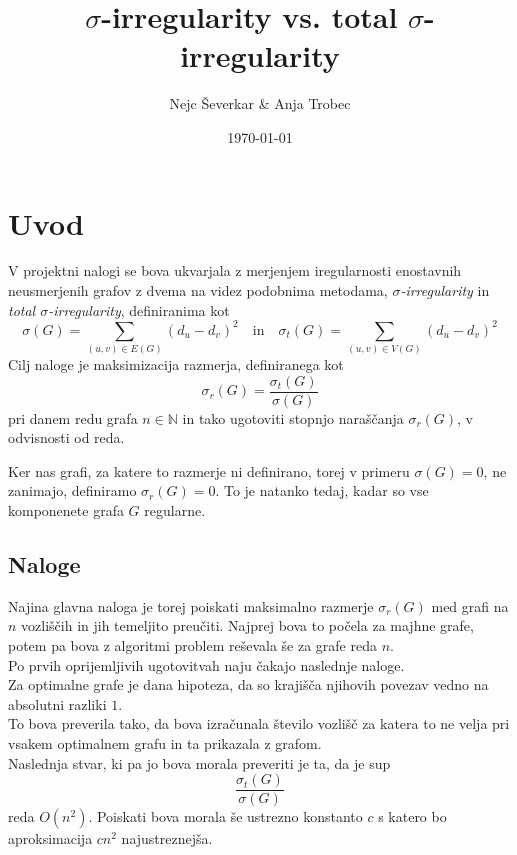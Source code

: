 \documentclass[ letterpaper, titlepage, fleqn]{article}
\begin{document}
\title{$\sigma$-irregularity vs. total $\sigma$-irregularity}
\author{Nejc Ševerkar \& Anja Trobec}
\date{\today}
\maketitle

\section{Uvod}
V projektni nalogi se bova ukvarjala z merjenjem iregularnosti enostavnih neusmerjenih grafov z
dvema na videz podobnima metodama, {\em $\sigma$-irregularity} in {\em total $\sigma$-irregularity},
definiranima kot 
$$
\sigma(G) = \sum_{(u, v) \in E(G)}(d_u - d_v)^2 
\quad \text{in} \quad
\sigma_t(G) = \sum_{(u, v) \in V(G)}(d_u - d_v)^2
$$
Cilj naloge je maksimizacija razmerja, definiranega kot 
$$\sigma_r(G) = \frac{\sigma_t(G)}{\sigma(G)}$$
pri danem redu grafa $n \in \mathbb{N}$ in tako ugotoviti 
stopnjo naraščanja $\sigma_r(G)$, v odvisnosti od reda.

Ker nas grafi, za katere to razmerje ni definirano,
torej v primeru $\sigma(G) = 0$, ne zanimajo, definiramo $\sigma_r(G) = 0$.
To je natanko tedaj, kadar so vse komponenete grafa $G$ regularne.

\subsection{Naloge}

Najina glavna naloga je torej poiskati maksimalno razmerje $\sigma_r(G)$ med grafi na $n$
vozliščih in jih temeljito preučiti. Najprej bova to počela za majhne grafe, potem pa bova 
z algoritmi problem reševala še za grafe reda $n$. \\

Po prvih oprijemljivih ugotovitvah naju čakajo naslednje naloge. \\

Za optimalne grafe je dana hipoteza, da so krajišča njihovih povezav vedno na absolutni razliki $1$. \\
To bova preverila tako, da bova izračunala število vozlišč za katera
to ne velja pri vsakem optimalnem grafu in ta prikazala z grafom. \\

Naslednja stvar, ki pa jo bova morala preveriti je ta, da je sup$$\frac{\sigma_t(G)}{\sigma(G)}$$ 
reda $O(n^2)$. 
Poiskati bova morala še ustrezno konstanto $c$ s katero bo aproksimacija $cn^2$ najustreznejša.
\end{document}
